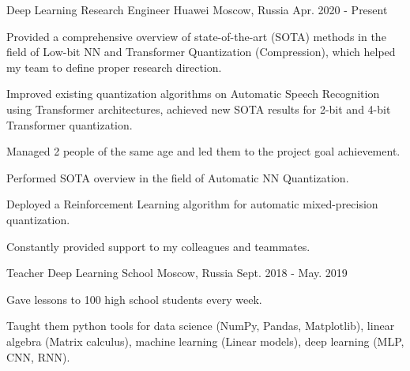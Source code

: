 

\begin{cventries}
  \cventry
  {Deep Learning Research Engineer} %
  {Huawei} %
  {Moscow, Russia} %
  {Apr. 2020 - Present} %
  {
    \begin{cvitems} %
      \item {Provided a comprehensive overview of state-of-the-art (SOTA) methods in the field of Low-bit NN and Transformer Quantization (Compression), which helped my team to define proper research direction.}
      \item {Improved existing quantization algorithms on Automatic Speech Recognition using Transformer architectures, achieved new SOTA results for 2-bit and 4-bit Transformer quantization.}
      \item {Managed 2 people of the same age and led them to the project goal achievement.}
      \item {Performed SOTA overview in the field of Automatic NN Quantization.}
      \item {Deployed a Reinforcement Learning algorithm for automatic mixed-precision quantization.}
      \item {Constantly provided support to my colleagues and teammates.}
    \end{cvitems}
  }

  \cventry
  {Teacher} %
  {Deep Learning School} %
  {Moscow, Russia} %
  {Sept. 2018 - May. 2019} %
  {
    \begin{cvitems} %
      \item {Gave lessons to 100 high school students every week.}
      \item {Taught them python tools for data science (NumPy, Pandas, Matplotlib), linear algebra (Matrix calculus), machine learning (Linear models), deep learning (MLP, CNN, RNN).}
    \end{cvitems}
  }


\end{cventries}
